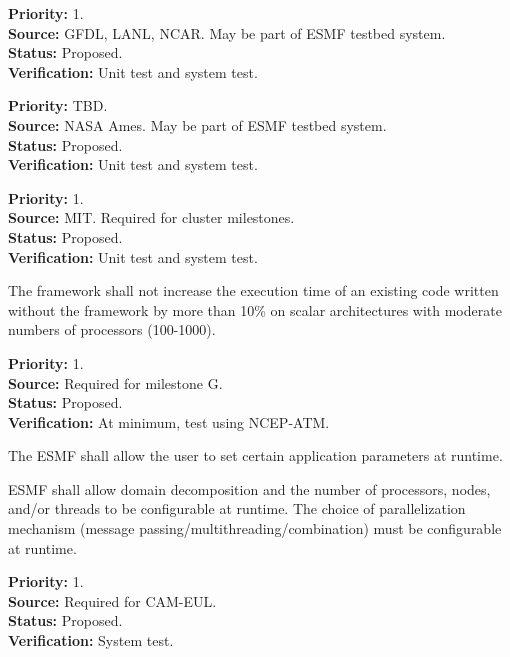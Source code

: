 \begin{reqlist}
{\bf Priority:} 1. \\
{\bf Source:} GFDL, LANL, NCAR.  May be part of ESMF testbed system. \\
{\bf Status:} Proposed. \\
{\bf Verification:} Unit test and system test.
\end{reqlist}

\begin{reqlist}
{\bf Priority:} TBD. \\
{\bf Source:} NASA Ames.  May be part of ESMF testbed system. \\
{\bf Status:} Proposed. \\
{\bf Verification:} Unit test and system test.
\end{reqlist}

\begin{reqlist}
{\bf Priority:} 1. \\
{\bf Source:} MIT.  Required for cluster milestones. \\
{\bf Status:} Proposed. \\
{\bf Verification:} Unit test and system test.
\end{reqlist}

The framework shall not increase the execution time of an existing code 
written without the framework by more than 10\% on scalar 
architectures with moderate numbers of processors (100-1000).
\begin{reqlist}
{\bf Priority:} 1. \\
{\bf Source:} Required for milestone G. \\
{\bf Status:} Proposed. \\
{\bf Verification:} At minimum, test using NCEP-ATM.
\end{reqlist}

The ESMF shall allow the user to set certain application parameters at runtime.

ESMF shall allow domain decomposition and the number of processors, 
nodes, and/or threads to be configurable at runtime.  The choice of
parallelization mechanism (message passing/multithreading/combination)
must be configurable at runtime.
\begin{reqlist}
{\bf Priority:} 1. \\
{\bf Source:} Required for CAM-EUL. \\
{\bf Status:} Proposed. \\
{\bf Verification:} System test.
\end{reqlist}

